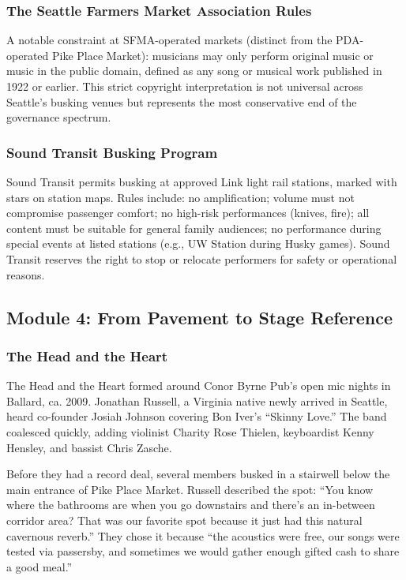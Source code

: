 \documentclass[11pt,letterpaper]{article}
\begin{document}
\subsubsection{The Seattle Farmers Market Association Rules}

A notable constraint at SFMA-operated markets (distinct from the PDA-operated Pike Place Market): musicians may only perform original music or music in the public domain, defined as any song or musical work published in 1922 or earlier. This strict copyright interpretation is not universal across Seattle's busking venues but represents the most conservative end of the governance spectrum.

\subsubsection{Sound Transit Busking Program}

Sound Transit permits busking at approved Link light rail stations, marked with stars on station maps. Rules include: no amplification; volume must not compromise passenger comfort; no high-risk performances (knives, fire); all content must be suitable for general family audiences; no performance during special events at listed stations (e.g., UW Station during Husky games). Sound Transit reserves the right to stop or relocate performers for safety or operational reasons.

\subsection{Module 4: From Pavement to Stage Reference}

\subsubsection{The Head and the Heart}

The Head and the Heart formed around Conor Byrne Pub's open mic nights in Ballard, ca. 2009. Jonathan Russell, a Virginia native newly arrived in Seattle, heard co-founder Josiah Johnson covering Bon Iver's ``Skinny Love.'' The band coalesced quickly, adding violinist Charity Rose Thielen, keyboardist Kenny Hensley, and bassist Chris Zasche.

Before they had a record deal, several members busked in a stairwell below the main entrance of Pike Place Market. Russell described the spot: ``You know where the bathrooms are when you go downstairs and there's an in-between corridor area? That was our favorite spot because it just had this natural cavernous reverb.'' They chose it because ``the acoustics were free, our songs were tested via passersby, and sometimes we would gather enough gifted cash to share a good meal.''
\end{document}
